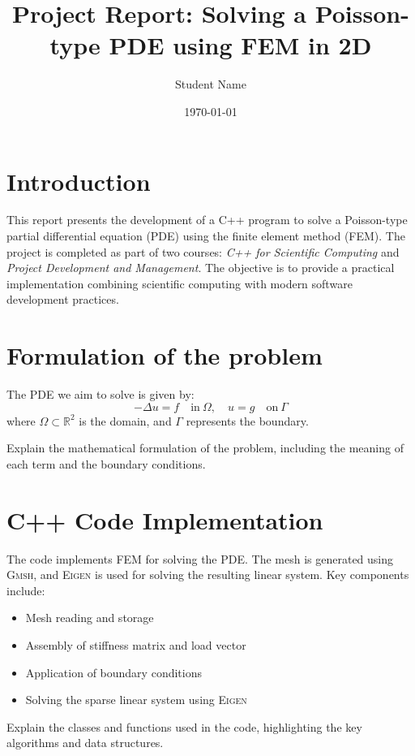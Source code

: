 \documentclass[english,10pt,a4paper]{article}
\title{Project Report: Solving a Poisson-type PDE using FEM in 2D}
\author{Student Name}
\date{\today}
\begin{document}
\maketitle

\tableofcontents

\section{Introduction}
\label{sec:introduction}
This report presents the development of a C++ program to solve a Poisson-type partial differential equation (PDE) using the finite element method (FEM). The project is completed as part of two courses: \textit{C++ for Scientific Computing} and \textit{Project Development and Management}. The objective is to provide a practical implementation combining scientific computing with modern software development practices.

\section{Formulation of the problem}
\label{sec:mathematical_formulation}
The PDE we aim to solve is given by:
\[
-\Delta u = f \quad \text{in} \ \Omega, \quad u = g \quad \text{on} \ \Gamma
\]
where $\Omega \subset \mathbb{R}^2$ is the domain, and $\Gamma$ represents the boundary.

Explain the mathematical formulation of the problem, including the meaning of each term and the boundary conditions.

\section{C++ Code Implementation}
\label{sec:cpp_implementation}
The code implements FEM for solving the PDE. The mesh is generated using \textsc{Gmsh}, and \textsc{Eigen} is used for solving the resulting linear system. Key components include:
\begin{itemize}
    \item Mesh reading and storage
    \item Assembly of stiffness matrix and load vector
    \item Application of boundary conditions
    \item Solving the sparse linear system using \textsc{Eigen}
\end{itemize}

Explain the classes and functions used in the code, highlighting the key algorithms and data structures.
\end{document}

